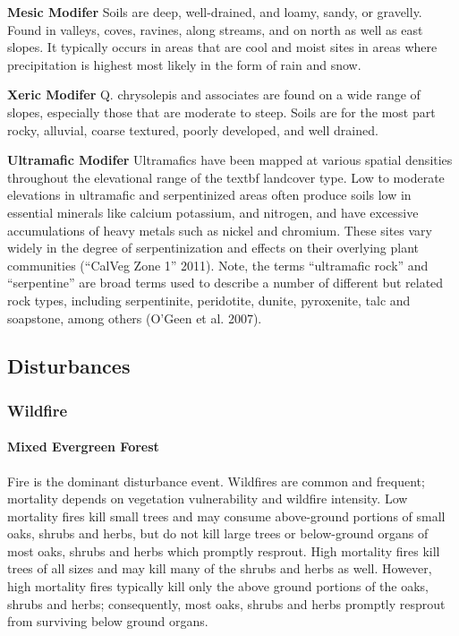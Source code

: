 \begin{adjustwidth}{2cm}{}
\textbf{Mesic Modifer }
Soils are deep, well-drained, and loamy, sandy, or gravelly. Found in valleys, coves, ravines, along streams, and on north as well as east slopes. It typically occurs in areas that are cool and moist sites in areas where precipitation is highest most likely in the form of rain and snow.

\medskip
\noindent \textbf{Xeric Modifer}
Q. chrysolepis and associates are found on a wide range of slopes, especially those that are moderate to steep. Soils are for the most part rocky, alluvial, coarse textured, poorly developed, and well drained. 

\medskip
\noindent \textbf{Ultramafic Modifer} Ultramafics have been mapped at various spatial densities throughout the elevational range of the textbf landcover type. Low to moderate elevations in ultramafic and serpentinized areas often produce soils low in essential minerals like calcium potassium, and nitrogen, and have excessive accumulations of heavy metals such as nickel and chromium. These sites vary widely in the degree of serpentinization and effects on their overlying plant communities (``CalVeg Zone 1'' 2011). Note, the terms ``ultramafic rock'' and ``serpentine'' are broad terms used to describe a number of different but related rock types, including serpentinite, peridotite, dunite, pyroxenite, talc and soapstone, among others (O’Geen et al. 2007). 

\end{adjustwidth}


\subsection*{Disturbances}
\subsubsection{Wildfire}

\paragraph{Mixed Evergreen Forest}		Fire is the dominant disturbance event. Wildfires are common and frequent; mortality depends on vegetation vulnerability and wildfire intensity. Low mortality fires kill small trees and may consume above-ground portions of small oaks, shrubs and herbs, but do not kill large trees or below-ground organs of most oaks, shrubs and herbs which promptly resprout. High mortality fires kill trees of all sizes and may kill many of the shrubs and herbs as well. However, high mortality fires typically kill only the above ground portions of the oaks, shrubs and herbs; consequently, most oaks, shrubs and herbs promptly resprout from surviving below ground organs.


